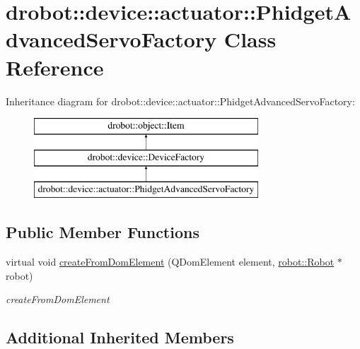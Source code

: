 \hypertarget{classdrobot_1_1device_1_1actuator_1_1PhidgetAdvancedServoFactory}{\section{drobot\-:\-:device\-:\-:actuator\-:\-:Phidget\-Advanced\-Servo\-Factory Class Reference}
\label{classdrobot_1_1device_1_1actuator_1_1PhidgetAdvancedServoFactory}
}
Inheritance diagram for drobot\-:\-:device\-:\-:actuator\-:\-:Phidget\-Advanced\-Servo\-Factory\-:\begin{figure}[H]
\begin{center}
\leavevmode
\includegraphics[height=3.000000cm]{classdrobot_1_1device_1_1actuator_1_1PhidgetAdvancedServoFactory}
\end{center}
\end{figure}
\subsection*{Public Member Functions}
\begin{DoxyCompactItemize}
\item 
virtual void \hyperlink{classdrobot_1_1device_1_1actuator_1_1PhidgetAdvancedServoFactory_a05fc8ede82777f4310ac0cf96e705dbe}{create\-From\-Dom\-Element} (Q\-Dom\-Element element, \hyperlink{classdrobot_1_1robot_1_1Robot}{robot\-::\-Robot} $\ast$robot)
\begin{DoxyCompactList}\small\item\em create\-From\-Dom\-Element \end{DoxyCompactList}\end{DoxyCompactItemize}
\subsection*{Additional Inherited Members}


